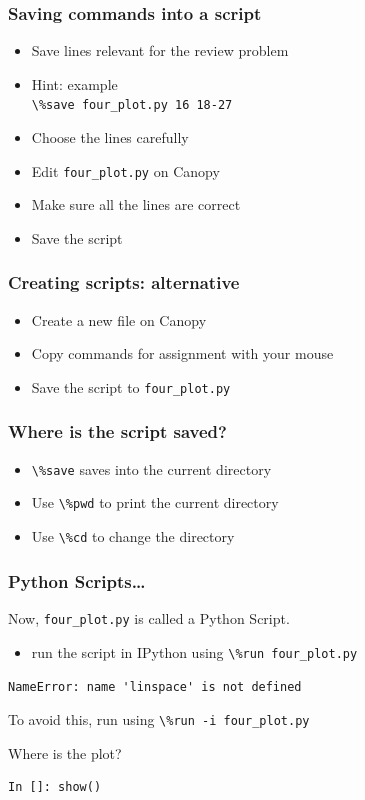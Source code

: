 \documentclass[14pt,compress]{beamer}
\newcounter{time}
\newcommand{\inctime}[1]{\addtocounter{time}{#1}{\tiny \thetime\ m}}
\newcommand{\typ}[1]{\lstinline{#1}}
\begin{document}
\begin{frame}[fragile]
  \frametitle{Saving commands into a script}
  \begin{itemize}
  \item Save lines relevant for the review problem
  \item Hint: example\\ \typ{\%save four_plot.py 16 18-27}
  \item Choose the lines carefully
  \item Edit \typ{four_plot.py} on Canopy
  \item Make sure all the lines are correct
  \item Save the script
  \end{itemize}
\inctime{5}
\end{frame}

\begin{frame}[fragile]
  \frametitle{Creating scripts: alternative}
  \begin{itemize}
  \item Create a new file on Canopy
  \item Copy commands for assignment with your mouse
  \item Save the script to \typ{four_plot.py}
  \end{itemize}
\end{frame}

\begin{frame}[fragile]
  \frametitle{Where is the script saved?}
  \begin{itemize}
  \item \typ{\%save} saves into the current directory
    \vspace*{0.5in}
  \item Use \typ{\%pwd} to print the current directory
  \item Use \typ{\%cd} to change the directory
  \end{itemize}
\end{frame}


\begin{frame}[fragile]
\frametitle{Python Scripts\ldots}
Now, \typ{four_plot.py} is called a Python Script.
 \begin{itemize}
 \item run the script in IPython using \typ{\%run four_plot.py}\\
 \end{itemize}
\pause
\alert{\typ{NameError: name 'linspace' is not defined}}
\begin{block}{}
To avoid this, run using \alert{\typ{\%run -i four_plot.py}}\\
\end{block}
\pause
Where is the plot?
\begin{lstlisting}
In []: show()
\end{lstlisting}
\end{frame}
\end{document}
